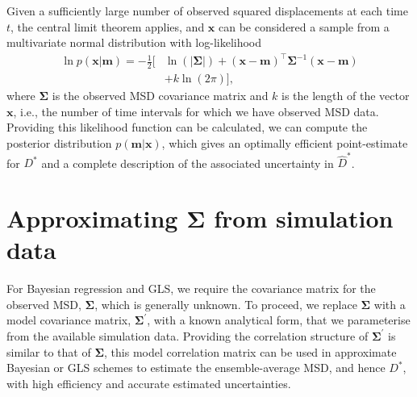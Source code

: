 \documentclass[reprint,superscriptaddress,nobibnotes,amsmath,amssymb,aps,prx,hidelinks]{revtex4-2}
\newcommand{\oMSD}{\ensuremath{\bm{x}}}
\newcommand{\model}{\bm{m}}
\newcommand{\prob}[1]{\ensuremath{p(#1)}}
\newcommand{\Dest}{\ensuremath{\widehat{D}^*}}
\newcommand{\D}{\ensuremath{D^*}}
\begin{document}
Given a sufficiently large number of observed squared displacements at each time $t$, the central limit theorem applies, and $\oMSD$ can be considered a sample from a multivariate normal distribution with log-likelihood
%
\begin{equation}
    \begin{aligned}{}
      \ln \prob{\oMSD|\model} = -\frac{1}{2}\big[ & \ln(\left|\mathbf{\Sigma}\right|) + {(\oMSD - \model)}^{\!\top}\mathbf{\Sigma}^{-1}(\oMSD - \model) \\ 
      & + k \ln(2\pi)\big],
    \end{aligned}
    \label{equ:loglike}
\end{equation}
%
where $\mathbf{\Sigma}$ is the observed MSD covariance matrix and $k$ is the length of the vector $\oMSD$, i.e., the number of time intervals for which we have observed MSD data.
Providing this likelihood function can be calculated, we can compute the posterior distribution $\prob{\model | \oMSD}$, which gives an optimally efficient point-estimate for $\D$ and a complete description of the associated uncertainty in $\Dest$.

\section{Approximating $\bm{\Sigma}$ from simulation data}

For Bayesian regression and GLS, we require the covariance matrix for the observed MSD, $\mathbf{\Sigma}$, which is generally unknown.
To proceed, we replace $\mathbf{\Sigma}$ with a model covariance matrix, $\mathbf{\Sigma^\prime}$, with a known analytical form, that we parameterise from the available simulation data.
Providing the correlation structure of $\mathbf{\Sigma^\prime}$ is similar to that of $\mathbf{\Sigma}$, this model correlation matrix can be used in approximate Bayesian or GLS schemes to estimate the ensemble-average MSD, and hence $\D$, with high efficiency and accurate estimated uncertainties.
\end{document}
